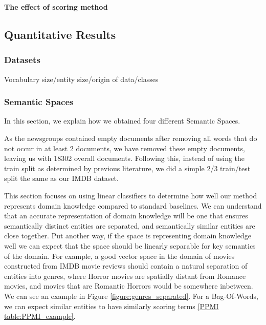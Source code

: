 \textbf{The effect of scoring method}

\subsection{Quantitative Results}

\subsubsection{Datasets}

Vocabulary size/entity size/origin of data/classes

\subsubsection{Semantic Spaces}
In this section, we explain how we obtained four different Semantic Spaces. \label{ch3:Method}

As the newsgroups contained empty documents after removing all words that do not occur in at least 2 documents, we have removed these empty documents, leaving us with 18302 overall documents. Following this, instead of using the train split as determined by previous literature, we did a simple 2/3 train/test split the same as our IMDB dataset.

This section focuses on using linear classifiers to determine how well our method represents domain knowledge compared to standard baselines. We can understand that an accurate representation of domain knowledge will be one that ensures semantically distinct entities are separated, and semantically similar entities are close together. Put another way, if the space is representing domain knowledge well we can expect that the space should be linearly separable for key semantics of the domain. For example, a good vector space in the domain of movies constructed from IMDB movie reviews should contain a natural separation of entities into genres, where Horror movies are spatially distant from Romance movies, and movies that are Romantic Horrors would be somewhere inbetween. We can see an example in Figure \ref{figure:genres_separated}. For a Bag-Of-Words, we can expect similar entities to have similarly scoring terms \ref{PPMI table:PPMI_example}.

